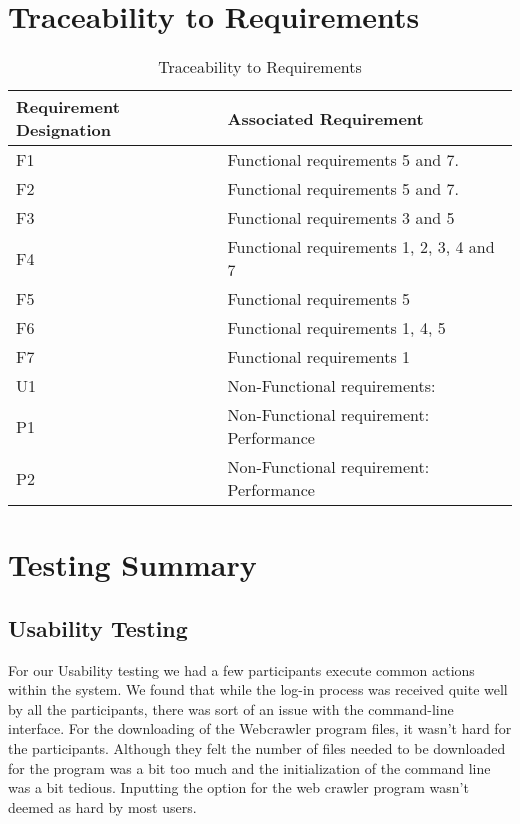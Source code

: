 \documentclass[12pt, titlepage]{article}
\begin{document}
\pagebreak

\section{Traceability to Requirements}
\begin{table}[h!]
\centering
\begin{tabular}{| p{2.5cm} | p{8cm} |}   \hline
	Requirement Designation &Associated Requirement\\ \hline
	F1 &Functional requirements 5 and 7.\\ \hline
	F2 &Functional requirements 5 and 7.\\ \hline
	F3 &Functional requirements 3 and 5 \\ \hline
	F4 &Functional requirements 1, 2, 3, 4 and 7 \\ \hline
	F5 &Functional requirements 5 \\ \hline
	F6 &Functional requirements 1, 4, 5 \\ \hline
	F7 &Functional requirements 1 \\ \hline
	U1 &Non-Functional requirements: \\ \hline
	P1 &Non-Functional requirement: Performance\\ \hline
	P2 &Non-Functional requirement: Performance\\ \hline
\end{tabular}
\caption{Traceability to Requirements}
\label{table:Traceability to Requirements}
\end{table}


\section{Testing Summary}
\subsection{Usability Testing }
For our Usability testing we had a few participants execute common actions within the system. We found that while the log-in process was received quite well by all the participants, there was sort of an issue with the command-line interface. For the downloading of the Webcrawler program files, it wasn't hard for the participants. Although they felt the number of files needed to be downloaded for the program was a bit too much and  the initialization of the command line was a bit tedious.
Inputting the option for the web crawler program wasn't deemed as hard by most users.
\end{document}

